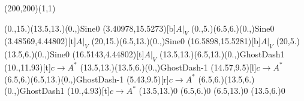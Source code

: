 \unitlength=1bp%

\begin{feynartspicture}(200,200)(1,1)

\FADiagram{}
\FAProp(0.,15.)(13.5,13.)(0.,){Sine}{0}
\FALabel(3.40978,15.5273)[b]{$A|_V$}
\FAProp(0.,5.)(6.5,6.)(0.,){Sine}{0}
\FALabel(3.48569,4.44802)[t]{$A|_V$}
\FAProp(20,15.)(6.5,13.)(0.,){Sine}{0}
\FALabel(16.5898,15.5281)[b]{$A|_V$}
\FAProp(20,5.)(13.5,6.)(0.,){Sine}{0}
\FALabel(16.5143,4.44802)[t]{$A|_V$}
\FAProp(13.5,13.)(6.5,13.)(0.,){GhostDash}{1}
\FALabel(10.,11.93)[t]{$c\to A^*$}
\FAProp(13.5,13.)(13.5,6.)(0.,){GhostDash}{-1}
\FALabel(14.57,9.5)[l]{$c\to A^*$}
\FAProp(6.5,6.)(6.5,13.)(0.,){GhostDash}{-1}
\FALabel(5.43,9.5)[r]{$c\to A^*$}
\FAProp(6.5,6.)(13.5,6.)(0.,){GhostDash}{1}
\FALabel(10.,4.93)[t]{$c\to A^*$}
\FAVert(13.5,13.){0}
\FAVert(6.5,6.){0}
\FAVert(6.5,13.){0}
\FAVert(13.5,6.){0}
\end{feynartspicture}

